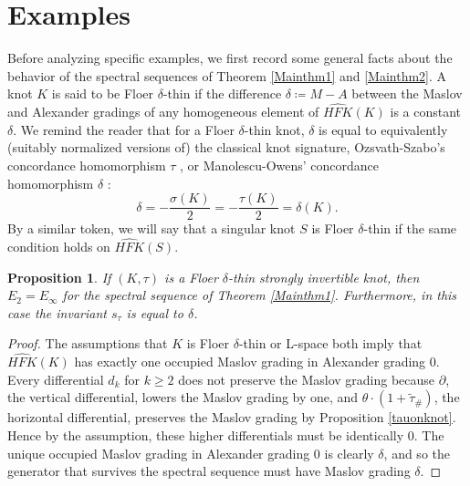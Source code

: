 \documentclass[11pt]{amsart}
\newtheorem{proposition}[theorem]{Proposition}
\theoremstyle{definition}
\theoremstyle{remark}
\def\HFK {\mathit{HFK}}
\newcommand\HFKhat{\widehat{\HFK}}
\numberwithin{equation}{section}
\begin{document}
 \section{Examples}\label{examples}
 Before analyzing specific examples, we first record some general facts about the behavior of the spectral sequences of Theorem \ref{Mainthm1} and \ref{Mainthm2}. A knot $K$ is said to be Floer $\delta$-thin if the difference $\delta\coloneq M-A$ between the Maslov and Alexander gradings of any homogeneous element of $\widehat{HFK}(K)$ is a constant $\delta.$ We remind the reader that for a Floer $\delta$-thin knot, $\delta$ is equal to equivalently (suitably normalized versions of) the classical knot signature, Ozsvath-Szabo's concordance homomorphism $\tau$ \cite{OS4ball}, or Manolescu-Owens' concordance homomorphism $\delta$ \cite{manolescu2005concordanceinvariantfloerhomology}: \[\delta=-\frac{\sigma(K)}{2}=-\frac{\tau(K)}{2}=\delta(K).\] By a similar token, we will say that a singular knot $S$ is Floer $\delta$-thin if the same condition holds on $\widehat{HFK}(S)$. 
 \begin{proposition}\label{thinknotss1}
     If $(K,\tau)$ is a Floer $\delta$-thin strongly invertible knot, then $E_2=E_\infty$ for the spectral sequence of Theorem \ref{Mainthm1}. Furthermore, in this case the invariant $s_{\tau}$ is equal to $\delta$. 
\end{proposition}
\begin{proof}
    The assumptions that $K$ is Floer $\delta$-thin or L-space both imply that $\HFKhat(K)$ has exactly one occupied Maslov grading in Alexander grading $0$. Every differential $d_k$ for $k\ge 2$ does not preserve the Maslov grading because $\partial$, the vertical differential, lowers the Maslov grading by one, and $\theta\cdot(1+\widetilde{\tau}_{\#})$, the horizontal differential, preserves the Maslov grading by Proposition \ref{tauonknot}. Hence by the assumption, these higher differentials must be identically $0$. The unique occupied Maslov grading in Alexander grading $0$ is clearly $\delta$, and so the generator that survives the spectral sequence must have Maslov grading $\delta$.
\end{proof}
\end{document}
